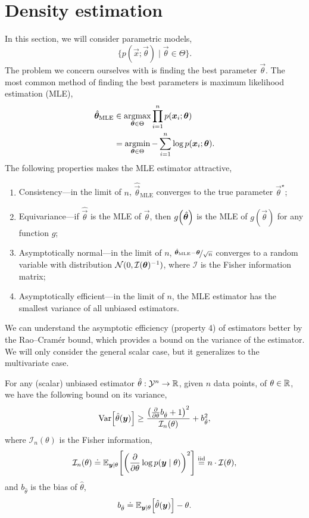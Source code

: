 \section{Density estimation}

In this section, we will consider parametric models, \[
    \{ p(\vec{x}; \vec{\theta}) \mid \vec{\theta} \in \Theta \}.
\]
The problem we concern ourselves with is finding the best parameter $\vec{\theta}$. The most common
method of finding the best parameters is maximum likelihood estimation (MLE),
\begin{align*}
    \hat{\vec{\theta}}_{\mathrm{MLE}} & \in \argmax_{\vec{\theta} \in \Theta} \prod_{i=1}^n p(\vec{x}_i; \vec{\theta})      \\
                                      & = \argmin_{\vec{\theta} \in \Theta} - \sum_{i=1}^n \log p(\vec{x}_i; \vec{\theta}).
\end{align*}
The following properties makes the MLE estimator attractive,
\begin{enumerate}
    \item Consistency---in the limit of $n$, $\hat{\vec{\theta}}_{\mathrm{MLE}}$ converges to the true
          parameter $\vec{\theta}^\star$;
    \item Equivariance---if $\hat{\vec{\theta}}$ is the MLE of $\vec{\theta}$, then
          $g\lft(\hat{\vec{\theta}}\rgt)$ is the MLE of $g(\vec{\theta})$ for any function $g$;
    \item Asymptotically normal---in the limit of $n$, $\nicefrac{\hat{\vec{\theta}}_{\mathrm{MLE}} -
                  \vec{\theta}}{\sqrt{n}}$ converges to a random variable with distribution $\mathcal{N}(0,
              \inv{\mathcal{I}(\vec{\theta})})$, where $\mathcal{I}$ is the Fisher information matrix;
    \item Asymptotically efficient---in the limit of $n$, the MLE estimator has the smallest variance of all
          unbiased estimators.
\end{enumerate}

We can understand the asymptotic efficiency (property 4) of estimators better by the Rao--Cram\'er
bound, which provides a bound on the variance of the estimator. We will only consider the general
scalar case, but it generalizes to the multivariate case.

\begin{theorem}
    For any (scalar) unbiased estimator $\hat{\theta}: \mathcal{Y}^n \to \R$, given $n$ data points,
    of $\theta \in \R$, we have the following bound on its variance, \[
        \Var\lft[\hat{\theta}(\vec{y})\rgt] \geq \frac{\lft( \pdv*{b_{\hat{\theta}}}{\theta} + 1 \rgt)^2}{\mathcal{I}_n(\theta)} + b_{\hat{\theta}}^2,
    \]
    where $\mathcal{I}_n(\theta)$ is the Fisher information, \[
        \mathcal{I}_n(\theta) \doteq \E_{\vec{y} \mid \theta} \lft[ \lft( \pdv*{\log p(\vec{y} \mid \theta)}{\theta} \rgt)^2 \rgt] \overset{\mathrm{iid}}{=} n \cdot \mathcal{I}(\theta),
    \]
    and $b_{\hat{\theta}}$ is the bias of $\hat{\theta}$, \[
        b_{\hat{\theta}} \doteq \E_{\vec{y} \mid \theta} \lft[ \hat{\theta}(\vec{y}) \rgt] - \theta.
    \]
\end{theorem}

